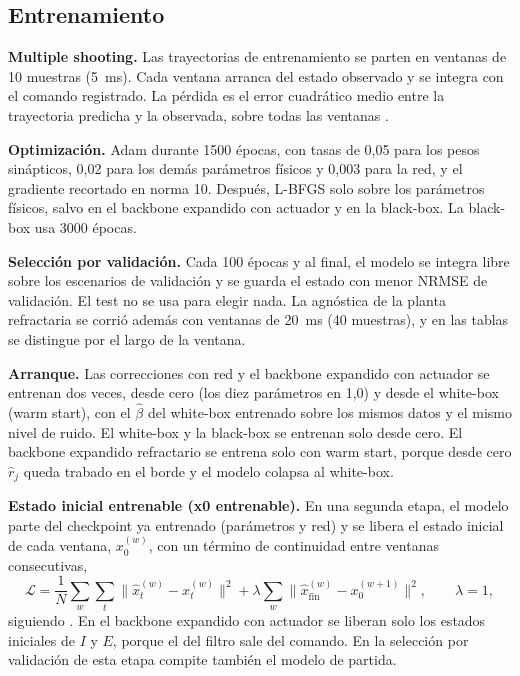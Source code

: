 \documentclass[11pt,a4paper]{article}
\newcommand{\bh}{\hat\beta}
\begin{document}
\subsection{Entrenamiento}

\textbf{Multiple shooting.} Las trayectorias de entrenamiento se parten en ventanas de 10 muestras (5~ms). Cada ventana arranca del estado observado y se integra con el comando registrado. La pérdida es el error cuadrático medio entre la trayectoria predicha y la observada, sobre todas las ventanas \cite{ribeiro2020,turan2022}.

\textbf{Optimización.} Adam durante 1500 épocas, con tasas de 0,05 para los pesos sinápticos, 0,02 para los demás parámetros físicos y 0,003 para la red, y el gradiente recortado en norma 10. Después, L-BFGS solo sobre los parámetros físicos, salvo en el backbone expandido con actuador y en la black-box. La black-box usa 3000 épocas.

\textbf{Selección por validación.} Cada 100 épocas y al final, el modelo se integra libre sobre los escenarios de validación y se guarda el estado con menor NRMSE de validación. El test no se usa para elegir nada. La agnóstica de la planta refractaria se corrió además con ventanas de 20~ms (40 muestras), y en las tablas se distingue por el largo de la ventana.

\textbf{Arranque.} Las correcciones con red y el backbone expandido con actuador se entrenan dos veces, desde cero (los diez parámetros en 1,0) y desde el white-box (warm start), con el $\bh$ del white-box entrenado sobre los mismos datos y el mismo nivel de ruido. El white-box y la black-box se entrenan solo desde cero. El backbone expandido refractario se entrena solo con warm start, porque desde cero $\hat r_j$ queda trabado en el borde y el modelo colapsa al white-box.

\textbf{Estado inicial entrenable (x0 entrenable).} En una segunda etapa, el modelo parte del checkpoint ya entrenado (parámetros y red) y se libera el estado inicial de cada ventana, $x_0^{(w)}$, con un término de continuidad entre ventanas consecutivas,
\begin{equation}
\mathcal{L} = \frac{1}{N}\sum_{w}\sum_{t}\big\|\hat x^{(w)}_t - x^{(w)}_t\big\|^2 + \lambda \sum_{w}\big\|\hat x^{(w)}_{\text{fin}} - x_0^{(w+1)}\big\|^2,\qquad \lambda = 1,
\end{equation}
siguiendo \cite{turan2022,giampiccolo2024}. En el backbone expandido con actuador se liberan solo los estados iniciales de $I$ y $E$, porque el del filtro sale del comando. En la selección por validación de esta etapa compite también el modelo de partida.
\end{document}
